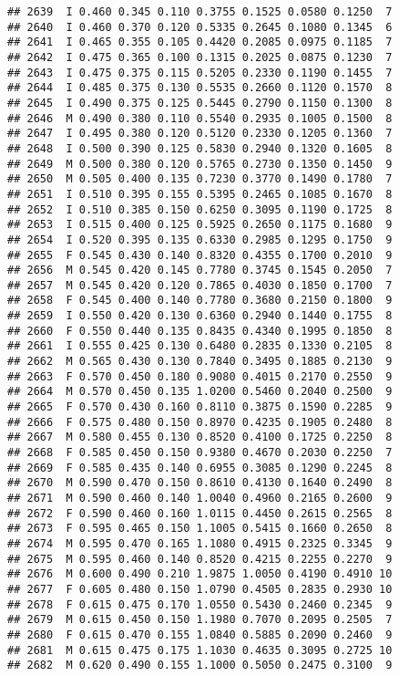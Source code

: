 \documentclass[
]{article}
\begin{document}
\begin{verbatim}
## 2639  I 0.460 0.345 0.110 0.3755 0.1525 0.0580 0.1250  7
## 2640  I 0.460 0.370 0.120 0.5335 0.2645 0.1080 0.1345  6
## 2641  I 0.465 0.355 0.105 0.4420 0.2085 0.0975 0.1185  7
## 2642  I 0.475 0.365 0.100 0.1315 0.2025 0.0875 0.1230  7
## 2643  I 0.475 0.375 0.115 0.5205 0.2330 0.1190 0.1455  7
## 2644  I 0.485 0.375 0.130 0.5535 0.2660 0.1120 0.1570  8
## 2645  I 0.490 0.375 0.125 0.5445 0.2790 0.1150 0.1300  8
## 2646  M 0.490 0.380 0.110 0.5540 0.2935 0.1005 0.1500  8
## 2647  I 0.495 0.380 0.120 0.5120 0.2330 0.1205 0.1360  7
## 2648  I 0.500 0.390 0.125 0.5830 0.2940 0.1320 0.1605  8
## 2649  M 0.500 0.380 0.120 0.5765 0.2730 0.1350 0.1450  9
## 2650  M 0.505 0.400 0.135 0.7230 0.3770 0.1490 0.1780  7
## 2651  I 0.510 0.395 0.155 0.5395 0.2465 0.1085 0.1670  8
## 2652  I 0.510 0.385 0.150 0.6250 0.3095 0.1190 0.1725  8
## 2653  I 0.515 0.400 0.125 0.5925 0.2650 0.1175 0.1680  9
## 2654  I 0.520 0.395 0.135 0.6330 0.2985 0.1295 0.1750  9
## 2655  F 0.545 0.430 0.140 0.8320 0.4355 0.1700 0.2010  9
## 2656  M 0.545 0.420 0.145 0.7780 0.3745 0.1545 0.2050  7
## 2657  M 0.545 0.420 0.120 0.7865 0.4030 0.1850 0.1700  7
## 2658  F 0.545 0.400 0.140 0.7780 0.3680 0.2150 0.1800  9
## 2659  I 0.550 0.420 0.130 0.6360 0.2940 0.1440 0.1755  8
## 2660  F 0.550 0.440 0.135 0.8435 0.4340 0.1995 0.1850  8
## 2661  I 0.555 0.425 0.130 0.6480 0.2835 0.1330 0.2105  8
## 2662  M 0.565 0.430 0.130 0.7840 0.3495 0.1885 0.2130  9
## 2663  F 0.570 0.450 0.180 0.9080 0.4015 0.2170 0.2550  9
## 2664  M 0.570 0.450 0.135 1.0200 0.5460 0.2040 0.2500  9
## 2665  F 0.570 0.430 0.160 0.8110 0.3875 0.1590 0.2285  9
## 2666  F 0.575 0.480 0.150 0.8970 0.4235 0.1905 0.2480  8
## 2667  M 0.580 0.455 0.130 0.8520 0.4100 0.1725 0.2250  8
## 2668  F 0.585 0.450 0.150 0.9380 0.4670 0.2030 0.2250  7
## 2669  F 0.585 0.435 0.140 0.6955 0.3085 0.1290 0.2245  8
## 2670  M 0.590 0.470 0.150 0.8610 0.4130 0.1640 0.2490  8
## 2671  M 0.590 0.460 0.140 1.0040 0.4960 0.2165 0.2600  9
## 2672  F 0.590 0.460 0.160 1.0115 0.4450 0.2615 0.2565  8
## 2673  F 0.595 0.465 0.150 1.1005 0.5415 0.1660 0.2650  8
## 2674  M 0.595 0.470 0.165 1.1080 0.4915 0.2325 0.3345  9
## 2675  M 0.595 0.460 0.140 0.8520 0.4215 0.2255 0.2270  9
## 2676  M 0.600 0.490 0.210 1.9875 1.0050 0.4190 0.4910 10
## 2677  F 0.605 0.480 0.150 1.0790 0.4505 0.2835 0.2930 10
## 2678  F 0.615 0.475 0.170 1.0550 0.5430 0.2460 0.2345  9
## 2679  M 0.615 0.450 0.150 1.1980 0.7070 0.2095 0.2505  7
## 2680  F 0.615 0.470 0.155 1.0840 0.5885 0.2090 0.2460  9
## 2681  M 0.615 0.475 0.175 1.1030 0.4635 0.3095 0.2725 10
## 2682  M 0.620 0.490 0.155 1.1000 0.5050 0.2475 0.3100  9

\end{verbatim}
\end{document}
